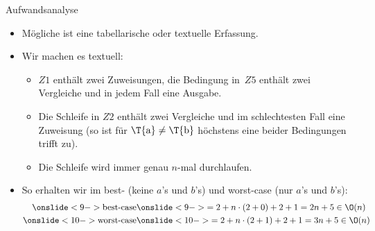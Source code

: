 {\begin{frame}{Aufwandsanalyse}
\begin{itemize}
    \itemsep14pt
    \item<3-> Mögliche ist eine tabellarische oder textuelle Erfassung.
    \item<4-> Wir machen es textuell: \begin{itemize}
        \itemsep7pt
        \item<5-> \(Z1\) enthält zwei Zuweisungen, die Bedingung in~\(Z5\) enthält zwei\\Vergleiche und in jedem Fall eine Ausgabe. %
        \item<6-> Die Schleife in \(Z2\) enthält zwei Vergleiche und im schlechtesten Fall eine Zuweisung (so ist für \(\text{\T{a}} \neq \text{\T{b}}\) höchstens eine beider Bedingungen trifft zu).
        \item<7-> Die Schleife wird immer genau \(n\)-mal durchlaufen.
    \end{itemize}
    \item<8-> So erhalten wir im best- (keine \(a\)'s und \(b\)'s) und worst-case (nur \(a\)'s und \(b\)'s):\vspace*{-3.5mm} \begin{align*}
        \onslide<9->{\text{best-case}} &\onslide<9->{= 2 + n \cdot (2 + 0) + 2 + 1 = 2n + 5 \in \O(n)}\\
        \onslide<10->{\text{worst-case}} &\onslide<10->{= 2 + n \cdot (2 + 1) + 2 + 1 = 3n + 5 \in \O(n)}
    \end{align*}
\end{itemize}
\tikzpicture[@O]
\endtikzpicture
\end{frame}
}

